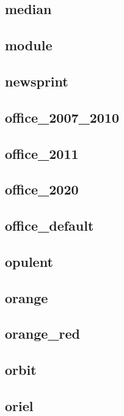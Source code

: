\subsection{\ttfamily median}
\newpage
\subsection{\ttfamily module}
\newpage
\subsection{\ttfamily newsprint}
\newpage
\subsection{\ttfamily office\_2007\_2010}
\newpage
\subsection{\ttfamily office\_2011}
\newpage
\subsection{\ttfamily office\_2020}
\newpage
\subsection{\ttfamily office\_default}
\newpage
\subsection{\ttfamily opulent}
\newpage
\subsection{\ttfamily orange}
\newpage
\subsection{\ttfamily orange\_red}
\newpage
\subsection{\ttfamily orbit}
\newpage
\subsection{\ttfamily oriel}
\newpage
